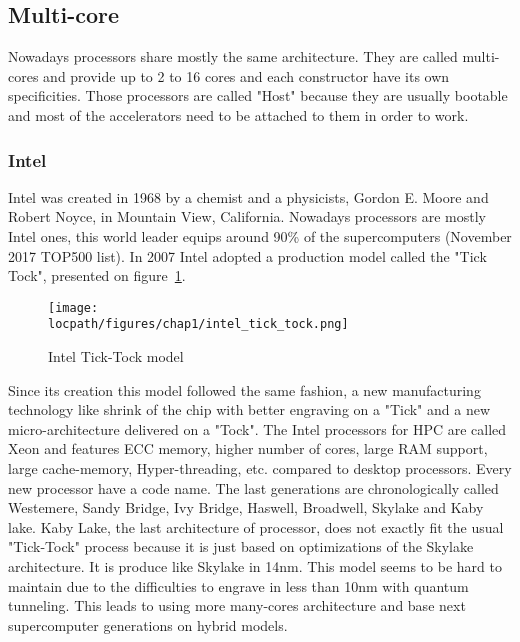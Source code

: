 \subsection{Multi-core}

Nowadays processors share mostly the same architecture. 
They are called multi-cores and provide up to 2 to 16 cores and each constructor have its own specificities. 
Those processors are called "Host" because they are usually bootable and most of the accelerators need to be attached to them in order to work.

\subsubsection{Intel}

Intel was created in 1968 by a chemist and a physicists, Gordon E. Moore and Robert Noyce, in Mountain View, California. 
Nowadays processors are mostly Intel ones, this world leader equips around 90\% of the supercomputers (November 2017 TOP500 list).
In 2007 Intel adopted a production model called the "Tick Tock", presented on figure~\ref{fig:1_HPC:intel_tick_tock}.

\begin{figure}
\begin{center}
\texttt{[image: \\locpath/figures/chap1/intel\_tick\_tock.png]}
\caption{Intel Tick-Tock model}
\label{fig:1_HPC:intel_tick_tock}
\end{center}
\end{figure}

Since its creation this model followed the same fashion, a new manufacturing technology like shrink of the chip with better engraving on a "Tick" and a new micro-architecture delivered on a "Tock".
The Intel processors for HPC are called Xeon and features ECC memory, higher number of cores, large RAM support, large cache-memory, Hyper-threading, etc. compared to desktop processors. 
Every new processor have a code name. 
The last generations are chronologically called Westemere, Sandy Bridge, Ivy Bridge, Haswell, Broadwell, Skylake and Kaby lake. 
Kaby Lake, the last architecture of processor, does not exactly fit the usual "Tick-Tock" process because it is just based on optimizations of the Skylake architecture. 
It is produce like Skylake in 14nm.
This model seems to be hard to maintain due to the difficulties to engrave in less than 10nm with quantum tunneling. 
This leads to using more many-cores architecture and base next supercomputer generations on hybrid models. 

